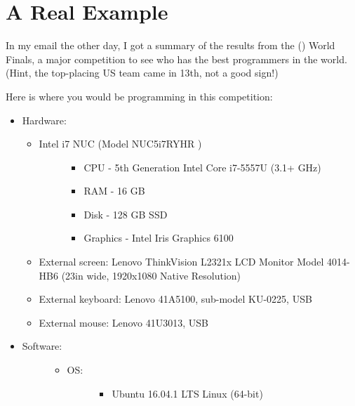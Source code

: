 \documentclass[letterpaper,11pt,english]{sphinxmanual}
\begin{document}
\section{A Real Example}
\label{\detokenize{01_introduction/are-you-ready-to-code:a-real-example}}
In my email the other day, I got a summary of the results from the 
() World Finals, a major
competition to see who has the best programmers in the world. (Hint, the
top-placing US team came in 13th, not a good sign!)

Here is where you would be programming in this competition:
\begin{itemize}
\item {} 
Hardware:
\begin{itemize}
\item {} \begin{description}
\item[{Intel i7 NUC (Model NUC5i7RYHR )}] \leavevmode\begin{itemize}
\item {} 
CPU - 5th Generation Intel Core i7-5557U (3.1+ GHz)

\item {} 
RAM - 16 GB

\item {} 
Disk - 128 GB SSD

\item {} 
Graphics - Intel Iris Graphics 6100

\end{itemize}

\end{description}

\item {} 
External screen: Lenovo ThinkVision L2321x LCD Monitor Model 4014-HB6 (23in wide, 1920x1080 Native Resolution)

\item {} 
External keyboard: Lenovo 41A5100, sub-model KU-0225, USB

\item {} 
External mouse: Lenovo 41U3013, USB

\end{itemize}

\item {} \begin{description}
\item[{Software:}] \leavevmode\begin{itemize}
\item {} \begin{description}
\item[{OS:}] \leavevmode\begin{itemize}
\item {} 
Ubuntu 16.04.1 LTS Linux (64-bit)


\end{itemize}
\end{description}
\end{itemize}
\end{description}
\end{itemize}
\end{document}
